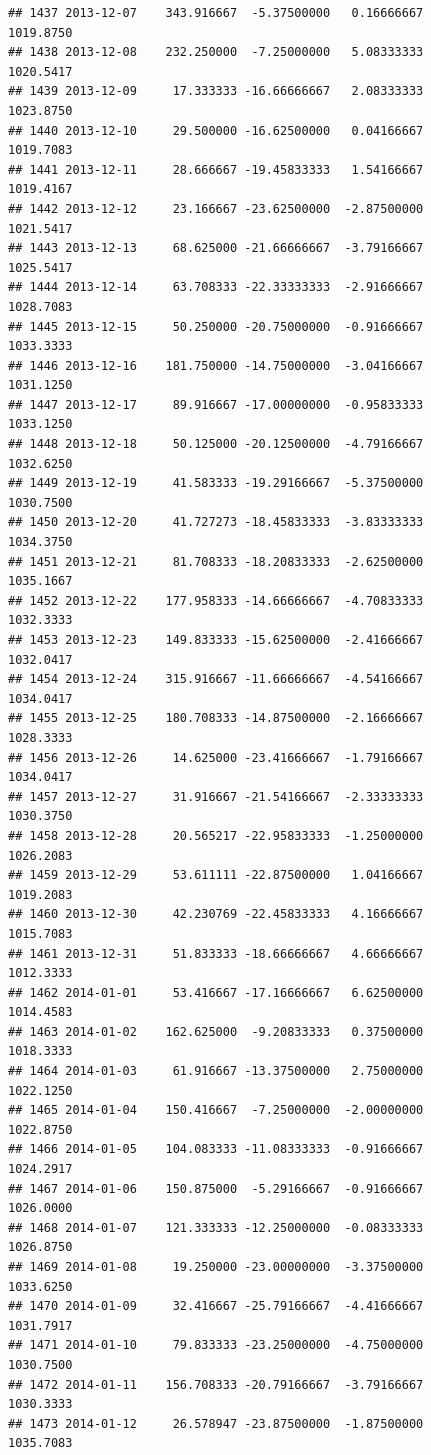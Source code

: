 \documentclass[
]{article}
\begin{document}
\begin{verbatim}
## 1437 2013-12-07    343.916667  -5.37500000   0.16666667    1019.8750
## 1438 2013-12-08    232.250000  -7.25000000   5.08333333    1020.5417
## 1439 2013-12-09     17.333333 -16.66666667   2.08333333    1023.8750
## 1440 2013-12-10     29.500000 -16.62500000   0.04166667    1019.7083
## 1441 2013-12-11     28.666667 -19.45833333   1.54166667    1019.4167
## 1442 2013-12-12     23.166667 -23.62500000  -2.87500000    1021.5417
## 1443 2013-12-13     68.625000 -21.66666667  -3.79166667    1025.5417
## 1444 2013-12-14     63.708333 -22.33333333  -2.91666667    1028.7083
## 1445 2013-12-15     50.250000 -20.75000000  -0.91666667    1033.3333
## 1446 2013-12-16    181.750000 -14.75000000  -3.04166667    1031.1250
## 1447 2013-12-17     89.916667 -17.00000000  -0.95833333    1033.1250
## 1448 2013-12-18     50.125000 -20.12500000  -4.79166667    1032.6250
## 1449 2013-12-19     41.583333 -19.29166667  -5.37500000    1030.7500
## 1450 2013-12-20     41.727273 -18.45833333  -3.83333333    1034.3750
## 1451 2013-12-21     81.708333 -18.20833333  -2.62500000    1035.1667
## 1452 2013-12-22    177.958333 -14.66666667  -4.70833333    1032.3333
## 1453 2013-12-23    149.833333 -15.62500000  -2.41666667    1032.0417
## 1454 2013-12-24    315.916667 -11.66666667  -4.54166667    1034.0417
## 1455 2013-12-25    180.708333 -14.87500000  -2.16666667    1028.3333
## 1456 2013-12-26     14.625000 -23.41666667  -1.79166667    1034.0417
## 1457 2013-12-27     31.916667 -21.54166667  -2.33333333    1030.3750
## 1458 2013-12-28     20.565217 -22.95833333  -1.25000000    1026.2083
## 1459 2013-12-29     53.611111 -22.87500000   1.04166667    1019.2083
## 1460 2013-12-30     42.230769 -22.45833333   4.16666667    1015.7083
## 1461 2013-12-31     51.833333 -18.66666667   4.66666667    1012.3333
## 1462 2014-01-01     53.416667 -17.16666667   6.62500000    1014.4583
## 1463 2014-01-02    162.625000  -9.20833333   0.37500000    1018.3333
## 1464 2014-01-03     61.916667 -13.37500000   2.75000000    1022.1250
## 1465 2014-01-04    150.416667  -7.25000000  -2.00000000    1022.8750
## 1466 2014-01-05    104.083333 -11.08333333  -0.91666667    1024.2917
## 1467 2014-01-06    150.875000  -5.29166667  -0.91666667    1026.0000
## 1468 2014-01-07    121.333333 -12.25000000  -0.08333333    1026.8750
## 1469 2014-01-08     19.250000 -23.00000000  -3.37500000    1033.6250
## 1470 2014-01-09     32.416667 -25.79166667  -4.41666667    1031.7917
## 1471 2014-01-10     79.833333 -23.25000000  -4.75000000    1030.7500
## 1472 2014-01-11    156.708333 -20.79166667  -3.79166667    1030.3333
## 1473 2014-01-12     26.578947 -23.87500000  -1.87500000    1035.7083

\end{verbatim}
\end{document}
